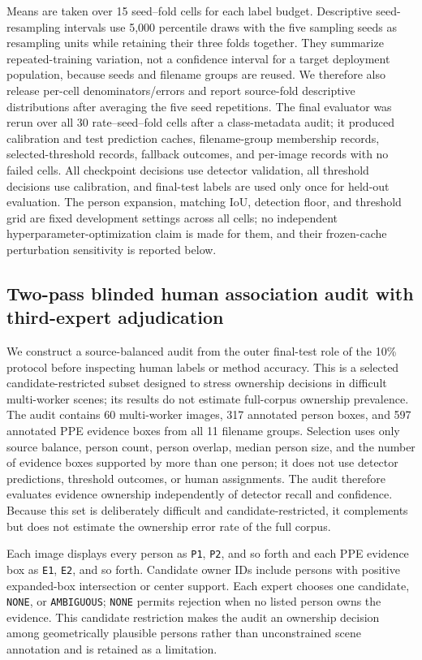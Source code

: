 \documentclass[iicol,pdflatex,sn-mathphys-num]{sn-jnl}
\begin{document}
Means are taken over 15 seed--fold cells for each label budget. Descriptive seed-resampling intervals use 5,000 percentile draws with the five sampling seeds as resampling units while retaining their three folds together. They summarize repeated-training variation, not a confidence interval for a target deployment population, because seeds and filename groups are reused. We therefore also release per-cell denominators/errors and report source-fold descriptive distributions after averaging the five seed repetitions. The final evaluator was rerun over all 30 rate--seed--fold cells after a class-metadata audit; it produced calibration and test prediction caches, filename-group membership records, selected-threshold records, fallback outcomes, and per-image records with no failed cells. All checkpoint decisions use detector validation, all threshold decisions use calibration, and final-test labels are used only once for held-out evaluation. The person expansion, matching IoU, detection floor, and threshold grid are fixed development settings across all cells; no independent hyperparameter-optimization claim is made for them, and their frozen-cache perturbation sensitivity is reported below.

\subsection{Two-pass blinded human association audit with third-expert adjudication}\label{sec:humanprotocol}

We construct a source-balanced audit from the outer final-test role of the 10\% protocol before inspecting human labels or method accuracy. This is a selected candidate-restricted subset designed to stress ownership decisions in difficult multi-worker scenes; its results do not estimate full-corpus ownership prevalence. The audit contains 60 multi-worker images, 317 annotated person boxes, and 597 annotated PPE evidence boxes from all 11 filename groups. Selection uses only source balance, person count, person overlap, median person size, and the number of evidence boxes supported by more than one person; it does not use detector predictions, threshold outcomes, or human assignments. The audit therefore evaluates evidence ownership independently of detector recall and confidence. Because this set is deliberately difficult and candidate-restricted, it complements but does not estimate the ownership error rate of the full corpus.

Each image displays every person as \texttt{P1}, \texttt{P2}, and so forth and each PPE evidence box as \texttt{E1}, \texttt{E2}, and so forth. Candidate owner IDs include persons with positive expanded-box intersection or center support. Each expert chooses one candidate, \texttt{NONE}, or \texttt{AMBIGUOUS}; \texttt{NONE} permits rejection when no listed person owns the evidence. This candidate restriction makes the audit an ownership decision among geometrically plausible persons rather than unconstrained scene annotation and is retained as a limitation.
\end{document}

